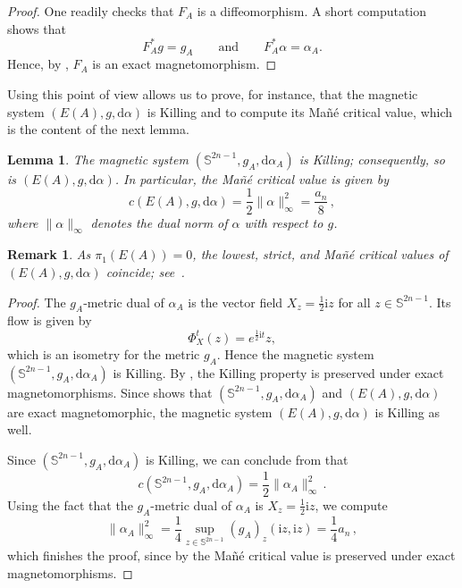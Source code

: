 \documentclass[11pt,reqno]{amsart}
\theoremstyle{plain}
\newtheorem{lem}[thm]{Lemma}
\newtheorem{rem}[thm]{Remark}
\theoremstyle{definition}
\numberwithin{equation}{section}
\def\d{\delta}
\def\d{\delta}
\def\d{{\mathrm{d}}}
\def\S{{\mathbb{S}^{2n-1}}}
\def\i{{\mathrm{i}}}
\begin{document}
\begin{proof}
One readily checks that $F_A$ is a diffeomorphism. A short computation shows that
\[
F_A^* g = g_A 
\qquad \text{and} \qquad 
F_A^* \alpha = \alpha_A .
\]
Hence, by , $F_A$ is an exact magnetomorphism. 
\end{proof}

Using this point of view allows us to prove, for instance, that the magnetic system $(E(A), g,\d\alpha)$ is Killing and to compute its Mañé critical value, which is the content of the next lemma.

\begin{lem}\label{lemm:mag_sys_Ellipsoid_are_Killing}
The magnetic system $(\mathbb{S}^{2n-1}, g_A, \d\alpha_A)$ is Killing; consequently, so is $(E(A),g,\d\alpha)$. In particular, the Mañé critical value is given by
\[
c(E(A),g,\d\alpha)
=\frac{1}{2}\|\alpha\|_\infty^2=\frac{a_n}{8}\, ,
\]
where $\|\alpha\|_\infty$ denotes the dual norm of $\alpha$ with respect to $g$.
\end{lem}

\begin{rem}
As $\pi_1(E(A))=0$, the lowest, strict, and Mañé critical values of $(E(A),g,\d\alpha)$ coincide; see~\cite{FathiMaderna2007}.
\end{rem}

\begin{proof}
The $g_A$-metric dual of $\alpha_A$ is the vector field $X_z= \tfrac{1}{2}\i z$ for all $z\in \S$. Its flow is given by
\begin{equation}\label{eq:flow_of_X}
    \varPhi_X^t(z)=e^{\frac{1}{2}\i t}z ,
\end{equation}
which is an isometry for the metric $g_A$. Hence the magnetic system $(\S,g_A,\d\alpha_A)$ is Killing. By , the Killing property is preserved under exact magnetomorphisms. Since  shows that $(\S,g_A,\d\alpha_A)$ and $(E(A),g,\d\alpha)$ are exact magnetomorphic, the magnetic system $(E(A),g,\d\alpha)$ is Killing as well.

Since $(\S,g_A,\d\alpha_A)$ is Killing, we can conclude from \cite[Thm. 2.4]{ABM} that
\[
c(\S,g_A,\d\alpha_A)= \frac{1}{2}\|\alpha_A\|_\infty^2\, .
\]
Using the fact that the $g_A$-metric dual of $\alpha_A$ is $X_z=\tfrac12 \i z$, we compute
\[
\|\alpha_A\|_\infty^2=\frac{1}{4}  \sup_{z\in \S}(g_A)_z(\i z, \i z)= \frac{1}{4}a_n\, ,
\]
which finishes the proof, since by  the Mañé critical value is preserved under exact magnetomorphisms.
\end{proof}
\end{document}
